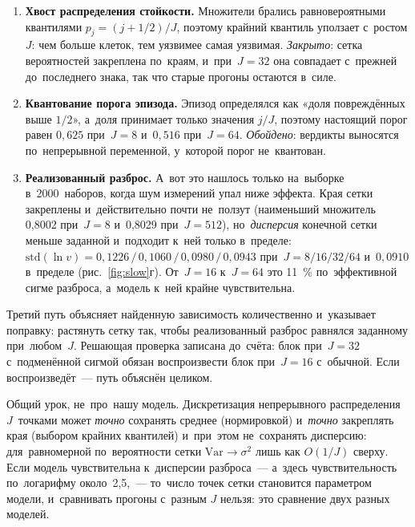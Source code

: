 \begin{enumerate}
\item \textbf{Хвост распределения стойкости.} Множители брались равновероятными квантилями $p_j=(j+1/2)/J$, поэтому крайний квантиль уползает с~ростом $J$: чем больше клеток, тем уязвимее самая уязвимая. \emph{Закрыто}: сетка вероятностей закреплена по~краям, и~при~$J=32$ она совпадает с~прежней до~последнего знака, так что старые прогоны остаются в~силе.
\item \textbf{Квантование порога эпизода.} Эпизод определялся как «доля повреждённых выше $1/2$», а~доля принимает только значения $j/J$, поэтому настоящий порог равен $0{,}625$ при~$J=8$ и~$0{,}516$ при~$J=64$. \emph{Обойдено}: вердикты выносятся по~непрерывной переменной, у~которой порог не~квантован.
\item \textbf{Реализованный разброс.} А~вот это нашлось только на~выборке в~2000~наборов, когда шум измерений упал ниже эффекта. Края сетки закреплены и~действительно почти не~ползут (наименьший множитель 0,8002 при~$J=8$ и~0,8029 при~$J=512$), но~\emph{дисперсия} конечной сетки меньше заданной и~подходит к~ней только в~пределе: $\mathrm{std}(\ln v)=0{,}1226\,/\,0{,}1060\,/\,0{,}0980\,/\,0{,}0943$ при~$J=8/16/32/64$ и~$0{,}0910$ в~пределе (рис.~\ref{fig:slow}г). От~$J=16$ к~$J=64$ это 11~\% по~эффективной сигме разброса, а~модель к~ней крайне чувствительна.
\end{enumerate}

Третий путь объясняет найденную зависимость количественно и~указывает поправку: растянуть сетку так, чтобы реализованный разброс равнялся заданному при~любом~$J$. Решающая проверка записана до~счёта: блок при~$J=32$ с~подменённой сигмой обязан воспроизвести блок при~$J=16$ с~обычной. Если воспроизведёт~--- путь объяснён целиком.

\begin{ineq}
Общий урок, не~про~нашу модель. Дискретизация непрерывного распределения $J$~точками может \emph{точно} сохранять среднее (нормировкой) и~\emph{точно} закреплять края (выбором крайних квантилей) и~при~этом не~сохранять дисперсию: для~равномерной по~вероятности сетки $\mathrm{Var}\to\sigma^2$ лишь как $O(1/J)$ сверху. Если модель чувствительна к~дисперсии разброса~--- а~здесь чувствительность по~логарифму около~2,5,~--- то~число точек сетки становится параметром модели, и~сравнивать прогоны с~разным $J$ нельзя: это сравнение двух разных моделей.
\end{ineq}


